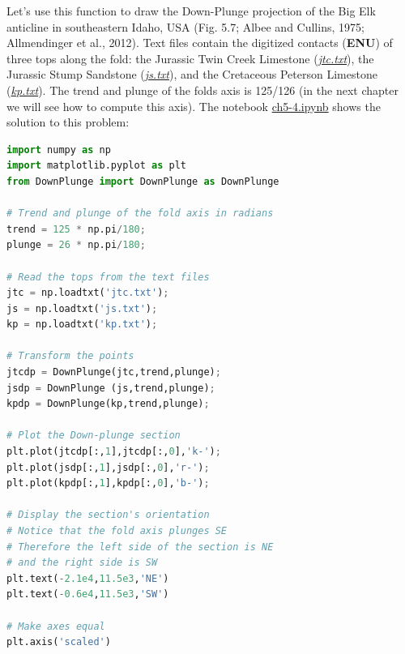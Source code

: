 \documentclass[a4paper , 12pt]{book}
\begin{document}
Let's use this function to draw the Down-Plunge projection of the Big Elk anticline in southeastern Idaho, USA (Fig. 5.7; Albee and Cullins, 1975; Allmendinger et al., 2012). Text files contain the digitized contacts (\textbf{ENU}) of three tops along the fold: the Jurassic Twin Creek Limestone (\href{http://github.com}{\textit{jtc.txt}}), the Jurassic Stump Sandstone (\href{http://github.com}{\textit{js.txt}}), and the Cretaceous Peterson Limestone (\href{http://github.com}{\textit{kp.txt}}). The trend and plunge of the folds axis is 125/126 (in the next chapter we will see how to compute this axis). The notebook \href{http://github.com}{ch5-4.ipynb} shows the solution to this problem:

\begin{center}
\begin{lstlisting}[language=Python, frame=single]
import numpy as np
import matplotlib.pyplot as plt
from DownPlunge import DownPlunge as DownPlunge

# Trend and plunge of the fold axis in radians
trend = 125 * np.pi/180;
plunge = 26 * np.pi/180;

# Read the tops from the text files
jtc = np.loadtxt('jtc.txt');
js = np.loadtxt('js.txt');
kp = np.loadtxt('kp.txt');

# Transform the points
jtcdp = DownPlunge(jtc,trend,plunge);
jsdp = DownPlunge (js,trend,plunge);
kpdp = DownPlunge(kp,trend,plunge);

# Plot the Down-plunge section
plt.plot(jtcdp[:,1],jtcdp[:,0],'k-');
plt.plot(jsdp[:,1],jsdp[:,0],'r-');
plt.plot(kpdp[:,1],kpdp[:,0],'b-');

# Display the section's orientation
# Notice that the fold axis plunges SE
# Therefore the left side of the section is NE
# and the right side is SW
plt.text(-2.1e4,11.5e3,'NE')
plt.text(-0.6e4,11.5e3,'SW')

# Make axes equal
plt.axis('scaled')
\end{lstlisting}
\end{center}
\end{document}
